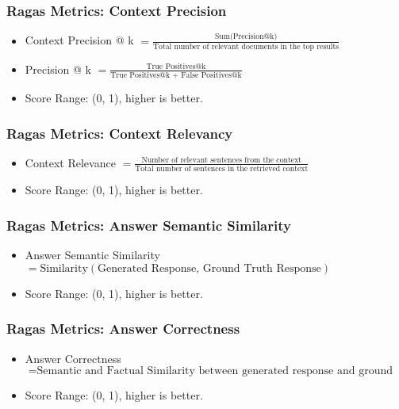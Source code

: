\begin{frame}[fragile]
\frametitle{Ragas Metrics: Context Precision}
\begin{itemize}
    \item Context Precision @ k $= \frac{\text{Sum(Precision@k)}}{\text{Total number of relevant documents in the top results}}$
    \item Precision @ k $= \frac{\text{True Positives@k}}{\text{True Positives@k + False Positives@k}}$
    \item Score Range: (0, 1), higher is better.
\end{itemize}
\end{frame}

\begin{frame}[fragile]
\frametitle{Ragas Metrics: Context Relevancy}
\begin{itemize}
    \item Context Relevance $= \frac{\text{Number of relevant sentences from the context}}{\text{Total number of sentences in the retrieved context}}$
    \item Score Range: (0, 1), higher is better.
\end{itemize}
\end{frame}

\begin{frame}[fragile]
\frametitle{Ragas Metrics: Answer Semantic Similarity}
\begin{itemize}
    \item Answer Semantic Similarity $= \text{Similarity}(\text{Generated Response, Ground Truth Response})$
    \item Score Range: (0, 1), higher is better.
\end{itemize}
\end{frame}

\begin{frame}[fragile]
\frametitle{Ragas Metrics: Answer Correctness}
\begin{itemize}
    \item Answer Correctness $= \text{Semantic and Factual Similarity between generated response and ground truth response}$
    \item Score Range: (0, 1), higher is better.
\end{itemize}
\end{frame}